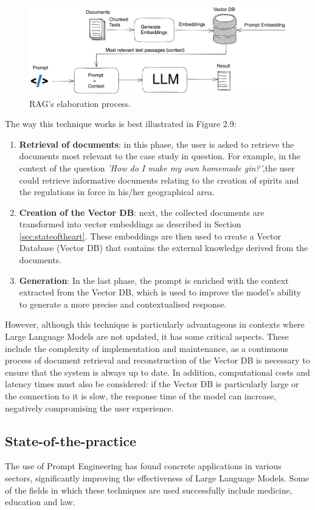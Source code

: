 \begin{figure}[h]
    \centering
    \includegraphics[width=0.7\linewidth]{Figures/RAG.png}
    \caption{RAG's elaboration process.}
    \label{fig:graph}
\end{figure}
The way this technique works is best illustrated in Figure 2.9:\\
\begin{enumerate}
    \item \textbf{Retrieval of documents}: in this phase, the user is asked to retrieve the documents most relevant to the case study in question. For example, in the context of the question \textit{'How do I make my own homemade gin?'},the user could retrieve informative documents relating to the creation of spirits and the regulations in force in his/her geographical area.
    \item \textbf{Creation of the Vector DB}: next, the collected documents are transformed into vector embeddings as described in Section \ref{sec:stateoftheart}. These embeddings are then used to create a Vector Database (Vector DB) that contains the external knowledge derived from the documents.
    \item \textbf{Generation}: In the last phase, the prompt is enriched with the context extracted from the Vector DB, which is used to improve the model's ability to generate a more precise and contextualised response.  
\end{enumerate}

However, although this technique is particularly advantageous in contexts where Large Language Models are not updated, it has some critical aspects. These include the complexity of implementation and maintenance, as a continuous process of document retrieval and reconstruction of the Vector DB is necessary to ensure that the system is always up to date. In addition, computational costs and latency times must also be considered: if the Vector DB is particularly large or the connection to it is slow, the response time of the model can increase, negatively compromising the user experience.

\subsection{State-of-the-practice}
\label{sec:stateofthepractice}
The use of Prompt Engineering has found concrete applications in various sectors, significantly improving the effectiveness of Large Language Models. Some of the fields in which these techniques are used successfully include medicine, education and law.


